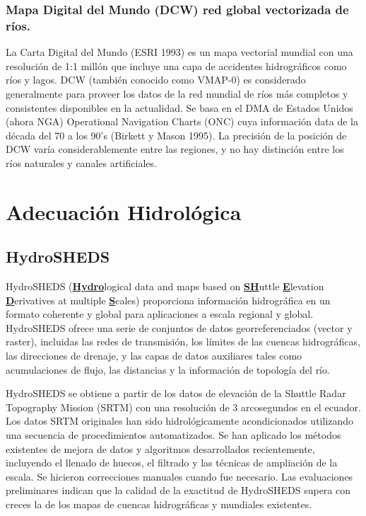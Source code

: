 \documentclass[10pt,a4paper, twoside]{report}
\begin{document}
\subsubsection{Mapa Digital del Mundo (DCW) red global vectorizada de ríos.}
\label{DCWLabel}

La Carta Digital del Mundo (ESRI 1993) es un mapa vectorial mundial con una resolución de 1:1 millón que incluye una capa de accidentes hidrográficos como ríos y lagos. DCW (también conocido como VMAP-0) es considerado generalmente para proveer los datos de la red mundial de ríos más completos y consistentes disponibles en la actualidad. Se basa en el DMA de Estados Unidos (ahora NGA) Operational Navigation Charts (ONC) cuya información data de la década del 70 a los 90's (Birkett y Mason 1995). La precisión de la posición de DCW varía considerablemente entre las regiones, y no hay distinción entre los ríos naturales y canales artificiales.

\section{Adecuación Hidrológica}


\subsection{HydroSHEDS}
\label{HydroSHEDSDef}

HydroSHEDS (\underline{\textbf{Hydro}}logical data and maps based on \underline{\textbf{SH}}uttle \underline{\textbf{E}}levation \underline{\textbf{D}}erivatives at multiple \underline{\textbf{S}}cales) proporciona información hidrográfica en un formato coherente y global para aplicaciones a escala regional y global. HydroSHEDS ofrece una serie de conjuntos de datos georreferenciados (vector y raster), incluidas las redes de transmisión, los límites de las cuencas hidrográficas, las direcciones de drenaje, y las capas de datos auxiliares tales como acumulaciones de flujo, las distancias y la información de topología del río.

HydroSHEDS se obtiene a partir de los datos de elevación de la Shuttle Radar Topography Mission (SRTM) con una resolución de 3 arcosegundos en el ecuador. Los datos SRTM originales han sido hidrológicamente acondicionados utilizando una secuencia de procedimientos automatizados. Se han aplicado los métodos existentes de mejora de datos y algoritmos desarrollados recientemente, incluyendo el llenado de huecos, el filtrado y las técnicas de ampliación de la escala. Se hicieron correcciones manuales cuando fue necesario. Las evaluaciones preliminares indican que la calidad de la exactitud de HydroSHEDS supera con creces la de los mapas de cuencas hidrográficas y mundiales existentes.
\end{document}
